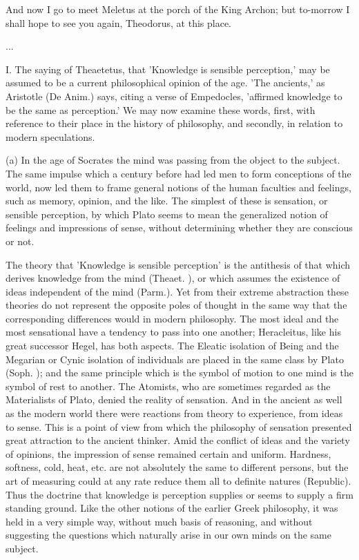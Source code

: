 \documentclass[11pt,letter]{article}
\begin{document}
\par  And now I go to meet Meletus at the porch of the King Archon; but to-morrow I shall hope to see you again, Theodorus, at this place.

\par  ...

\par  I. The saying of Theaetetus, that 'Knowledge is sensible perception,' may be assumed to be a current philosophical opinion of the age. 'The ancients,' as Aristotle (De Anim.) says, citing a verse of Empedocles, 'affirmed knowledge to be the same as perception.' We may now examine these words, first, with reference to their place in the history of philosophy, and secondly, in relation to modern speculations.

\par  (a) In the age of Socrates the mind was passing from the object to the subject. The same impulse which a century before had led men to form conceptions of the world, now led them to frame general notions of the human faculties and feelings, such as memory, opinion, and the like. The simplest of these is sensation, or sensible perception, by which Plato seems to mean the generalized notion of feelings and impressions of sense, without determining whether they are conscious or not.

\par  The theory that 'Knowledge is sensible perception' is the antithesis of that which derives knowledge from the mind (Theaet. ), or which assumes the existence of ideas independent of the mind (Parm.). Yet from their extreme abstraction these theories do not represent the opposite poles of thought in the same way that the corresponding differences would in modern philosophy. The most ideal and the most sensational have a tendency to pass into one another; Heracleitus, like his great successor Hegel, has both aspects. The Eleatic isolation of Being and the Megarian or Cynic isolation of individuals are placed in the same class by Plato (Soph. ); and the same principle which is the symbol of motion to one mind is the symbol of rest to another. The Atomists, who are sometimes regarded as the Materialists of Plato, denied the reality of sensation. And in the ancient as well as the modern world there were reactions from theory to experience, from ideas to sense. This is a point of view from which the philosophy of sensation presented great attraction to the ancient thinker. Amid the conflict of ideas and the variety of opinions, the impression of sense remained certain and uniform. Hardness, softness, cold, heat, etc. are not absolutely the same to different persons, but the art of measuring could at any rate reduce them all to definite natures (Republic). Thus the doctrine that knowledge is perception supplies or seems to supply a firm standing ground. Like the other notions of the earlier Greek philosophy, it was held in a very simple way, without much basis of reasoning, and without suggesting the questions which naturally arise in our own minds on the same subject.
\end{document}
